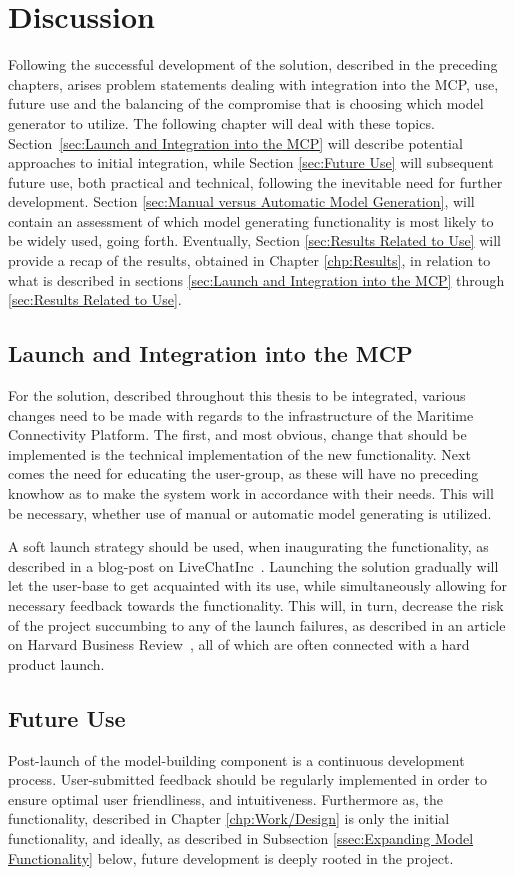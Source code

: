 \chapter{Discussion}
Following the successful development of the solution, described in the preceding chapters, arises problem statements dealing with integration into the MCP, use, future use and the balancing of the compromise that is choosing which model generator to utilize. The following chapter will deal with these topics. Section \ref{sec:Launch and Integration into the MCP} will describe potential approaches to initial integration, while Section \ref{sec:Future Use} will subsequent future use, both practical and technical, following the inevitable need for further development. Section \ref{sec:Manual versus Automatic Model Generation}, will contain an assessment of which model generating functionality is most likely to be widely used, going forth. Eventually, Section \ref{sec:Results Related to Use} will provide a recap of the results, obtained in Chapter \ref{chp:Results}, in relation to what is described in sections \ref{sec:Launch and Integration into the MCP} through \ref{sec:Results Related to Use}.

\section{Launch and Integration into the MCP}
For the solution, described throughout this thesis to be integrated, various changes need to be made with regards to the infrastructure of the Maritime Connectivity Platform. The first, and most obvious, change that should be implemented is the technical implementation of the new functionality. Next comes the need for educating the user-group, as these will have no preceding knowhow as to make the system work in accordance with their needs. This will be necessary, whether use of manual or automatic model generating is utilized.

A soft launch strategy should be used, when inaugurating the functionality, as described in a blog-post on LiveChatInc~\cite{hardoSoft}. Launching the solution gradually will let the user-base to get acquainted with its use, while simultaneously allowing for necessary feedback towards the functionality. This will, in turn, decrease the risk of the project succumbing to any of the launch failures, as described in an article on Harvard Business Review~\cite{hbr}, all of which are often connected with a hard product launch.
\section{Future Use}
Post-launch of the model-building component is a continuous development process. User-submitted feedback should be regularly implemented in order to ensure optimal user friendliness, and intuitiveness. Furthermore as, the functionality, described in Chapter \ref{chp:Work/Design} is only the initial functionality, and ideally, as described in Subsection \ref{ssec:Expanding Model Functionality} below, future development is deeply rooted in the project.

